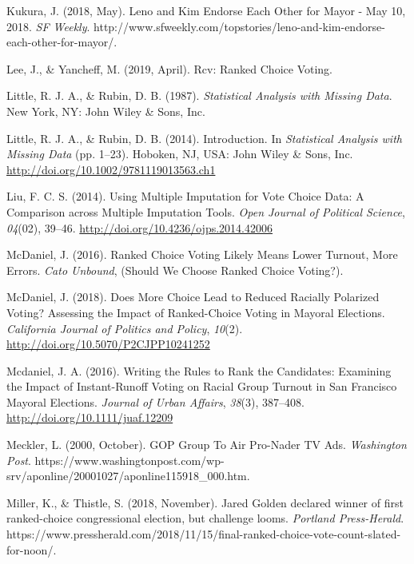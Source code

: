 \documentclass[12pt,twoside]{reedthesis}
\begin{document}
\leavevmode\hypertarget{ref-kukura_leno_2018}{}%
Kukura, J. (2018, May). Leno and Kim Endorse Each Other for Mayor - May 10, 2018. \emph{SF Weekly}. http://www.sfweekly.com/topstories/leno-and-kim-endorse-each-other-for-mayor/.

\leavevmode\hypertarget{ref-lee_rcv_2019}{}%
Lee, J., \& Yancheff, M. (2019, April). Rcv: Ranked Choice Voting.

\leavevmode\hypertarget{ref-little_statistical_1987}{}%
Little, R. J. A., \& Rubin, D. B. (1987). \emph{Statistical Analysis with Missing Data}. New York, NY: John Wiley \& Sons, Inc.

\leavevmode\hypertarget{ref-little_introduction_2014}{}%
Little, R. J. A., \& Rubin, D. B. (2014). Introduction. In \emph{Statistical Analysis with Missing Data} (pp. 1--23). Hoboken, NJ, USA: John Wiley \& Sons, Inc. \url{http://doi.org/10.1002/9781119013563.ch1}

\leavevmode\hypertarget{ref-liu_using_2014}{}%
Liu, F. C. S. (2014). Using Multiple Imputation for Vote Choice Data: A Comparison across Multiple Imputation Tools. \emph{Open Journal of Political Science}, \emph{04}(02), 39--46. \url{http://doi.org/10.4236/ojps.2014.42006}

\leavevmode\hypertarget{ref-mcdaniel_ranked_2016}{}%
McDaniel, J. (2016). Ranked Choice Voting Likely Means Lower Turnout, More Errors. \emph{Cato Unbound}, (Should We Choose Ranked Choice Voting?).

\leavevmode\hypertarget{ref-mcdaniel_does_2018}{}%
McDaniel, J. (2018). Does More Choice Lead to Reduced Racially Polarized Voting? Assessing the Impact of Ranked-Choice Voting in Mayoral Elections. \emph{California Journal of Politics and Policy}, \emph{10}(2). \url{http://doi.org/10.5070/P2CJPP10241252}

\leavevmode\hypertarget{ref-mcdaniel_writing_2016}{}%
Mcdaniel, J. A. (2016). Writing the Rules to Rank the Candidates: Examining the Impact of Instant-Runoff Voting on Racial Group Turnout in San Francisco Mayoral Elections. \emph{Journal of Urban Affairs}, \emph{38}(3), 387--408. \url{http://doi.org/10.1111/juaf.12209}

\leavevmode\hypertarget{ref-meckler_gop_2000}{}%
Meckler, L. (2000, October). GOP Group To Air Pro-Nader TV Ads. \emph{Washington Post}. https://www.washingtonpost.com/wp-srv/aponline/20001027/aponline115918\_000.htm.

\leavevmode\hypertarget{ref-miller_jared_2018}{}%
Miller, K., \& Thistle, S. (2018, November). Jared Golden declared winner of first ranked-choice congressional election, but challenge looms. \emph{Portland Press-Herald}. https://www.pressherald.com/2018/11/15/final-ranked-choice-vote-count-slated-for-noon/.
\end{document}
